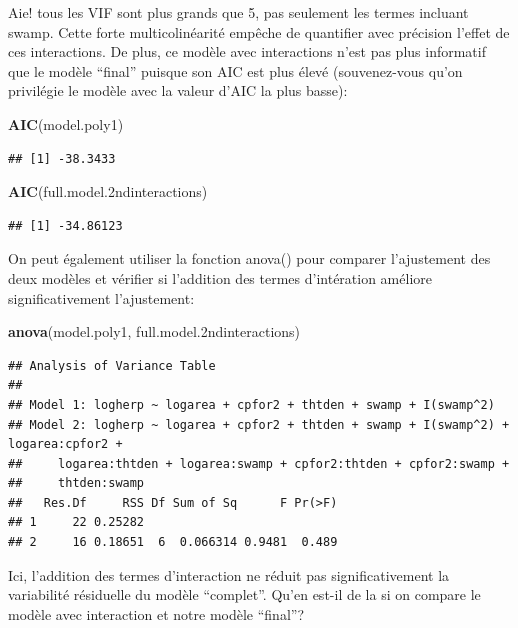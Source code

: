 \documentclass[
  12pt,
]{book}
\newenvironment{Shaded}{\begin{snugshade}}{\end{snugshade}}
\newcommand{\FloatTok}[1]{\textcolor[rgb]{0.00,0.00,0.81}{#1}}
\newcommand{\KeywordTok}[1]{\textcolor[rgb]{0.13,0.29,0.53}{\textbf{#1}}}
\newcommand{\NormalTok}[1]{#1}
\begin{document}
Aie! tous les VIF sont plus grands que 5, pas seulement les termes incluant swamp. Cette forte multicolinéarité empêche de quantifier avec précision l'effet de ces interactions. De plus, ce modèle avec interactions n'est pas plus informatif que le modèle ``final'' puisque son AIC est plus élevé (souvenez-vous qu'on privilégie le modèle avec la valeur d'AIC la plus basse):

\begin{Shaded}
\begin{Highlighting}[]
\KeywordTok{AIC}\NormalTok{(model.poly1)}
\end{Highlighting}
\end{Shaded}

\begin{verbatim}
## [1] -38.3433
\end{verbatim}

\begin{Shaded}
\begin{Highlighting}[]
\KeywordTok{AIC}\NormalTok{(full.model}\FloatTok{.2}\NormalTok{ndinteractions)}
\end{Highlighting}
\end{Shaded}

\begin{verbatim}
## [1] -34.86123
\end{verbatim}

On peut également utiliser la fonction anova() pour comparer l'ajustement des deux modèles et vérifier si l'addition des termes d'intération améliore significativement l'ajustement:

\begin{Shaded}
\begin{Highlighting}[]
\KeywordTok{anova}\NormalTok{(model.poly1, full.model}\FloatTok{.2}\NormalTok{ndinteractions)}
\end{Highlighting}
\end{Shaded}

\begin{verbatim}
## Analysis of Variance Table
## 
## Model 1: logherp ~ logarea + cpfor2 + thtden + swamp + I(swamp^2)
## Model 2: logherp ~ logarea + cpfor2 + thtden + swamp + I(swamp^2) + logarea:cpfor2 + 
##     logarea:thtden + logarea:swamp + cpfor2:thtden + cpfor2:swamp + 
##     thtden:swamp
##   Res.Df     RSS Df Sum of Sq      F Pr(>F)
## 1     22 0.25282                           
## 2     16 0.18651  6  0.066314 0.9481  0.489
\end{verbatim}

Ici, l'addition des termes d'interaction ne réduit pas significativement la variabilité résiduelle du modèle ``complet''. Qu'en est-il de la si on compare le modèle avec interaction et notre modèle ``final''?
\end{document}
